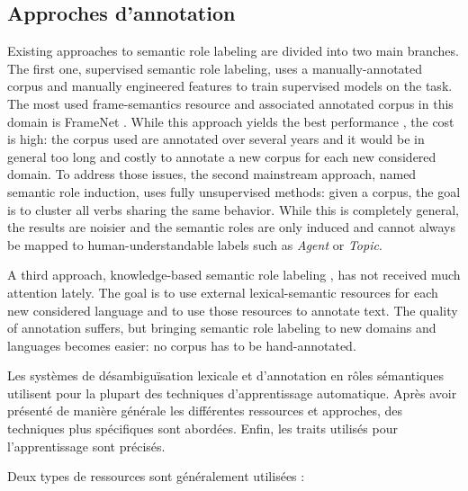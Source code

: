 \subsection{Approches d'annotation}

Existing approaches to semantic role labeling are divided into two main
branches. The first one, supervised semantic role labeling, uses a
manually-annotated corpus and manually engineered features to train supervised
models on the task. The most used frame-semantics resource and associated
annotated corpus in this domain is FrameNet \citep{baker1998berkeley}.
While this approach yields the best performance \citep{das2014frame}, the
cost is high: the corpus used are annotated over several years and it would be
in general too long and costly to annotate a new corpus for each new considered
domain. To address those issues, the second mainstream approach, named semantic
role induction, uses fully unsupervised methods: given a corpus, the goal is to
cluster all verbs sharing the same behavior. While this is completely general,
the results are noisier and the semantic roles are only induced and cannot
always be mapped to human-understandable labels such as \textit{Agent} or
\textit{Topic}.

A third approach, knowledge-based semantic role labeling
\citep{swier2004unsupervised,swier2005exploiting}, has not received much
attention lately. The goal is to use external lexical-semantic resources for
each new considered language and to use those resources to annotate text. The
quality of annotation suffers, but bringing semantic role labeling to new
domains and languages becomes easier: no corpus has to be hand-annotated.

Les systèmes de désambiguïsation lexicale et d'annotation en rôles sémantiques
utilisent pour la plupart des techniques d'apprentissage automatique. Après
avoir présenté de manière générale les différentes ressources et approches, des
techniques plus spécifiques sont abordées. Enfin, les traits utilisés pour
l'apprentissage sont précisés.

Deux types de ressources sont généralement utilisées :

